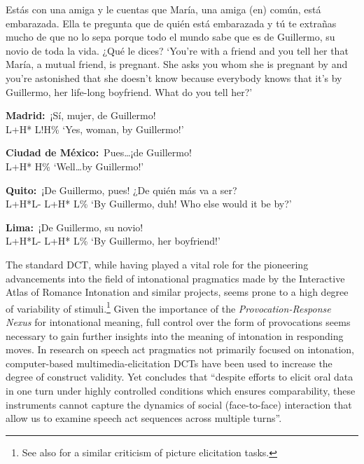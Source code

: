 \begin{exe}
	\ex \label{ex:obviedadQUESTIONNAIRE}
	Estás con una amiga y le cuentas que María, una amiga (en) común, está embarazada. Ella te pregunta que de quién está embarazada y tú te extrañas mucho de que no lo sepa porque todo el mundo sabe que es de Guillermo, su novio de toda la vida. ¿Qué le dices? 
	\glt `You're with a friend and you tell her that María, a mutual friend, is pregnant. She asks you whom she is pregnant by and you're astonished that she doesn't know because everybody knows that it's by Guillermo, her life-long boyfriend. What do you tell her?' 
	\begin{xlist}
		\ex \textbf{Madrid:}~¡Sí, mujer, de Guillermo! \\
		\hspace*{10em}L+H* L!H\% 
		\glt `Yes, woman, by Guillermo!' 
		
		\ex \textbf{Ciudad de México:}~Pues\ldots ¡de Guillermo! \\
		\hspace*{13em}L+H* H\% 
		\glt `Well\ldots by Guillermo!' 
		
		\ex \textbf{Quito:}~¡De Guillermo, pues! ¿De quién más va a ser? \\
		\hspace*{6em}L+H*L- \hspace*{10em} L+H* L\% 
		\glt `By Guillermo, duh! Who else would it be by?' 
		
		\ex \textbf{Lima:}~¡De Guillermo, su novio! \\
		\hspace*{6em}L+H*L- \hspace*{.5em} L+H* L\% 
		\glt `By Guillermo, her boyfriend!'
	\end{xlist}
\end{exe}

The standard \ac{DCT}, while having played a vital role for the pioneering advancements into the field of intonational pragmatics made by the Interactive Atlas of Romance Intonation and similar projects, seems prone to a high degree of variability of stimuli.\footnote{See also \citet[95]{Uth.2014} for a similar criticism of picture elicitation tasks.} Given the importance of the \textit{Provocation-Response Nexus} for intonational meaning, full control over the form of provocations seems necessary to gain further insights into the meaning of intonation in responding moves. In research on speech act pragmatics not primarily focused on intonation, computer-based multimedia-elicitation \acp{DCT} have been used to increase the degree of construct validity. Yet \citet[47]{FelixBrasdefer.2010} concludes that ``despite efforts to elicit oral data in one turn under highly controlled conditions which ensures comparability, these instruments
cannot capture the dynamics of social (face-to-face) interaction that allow us to examine speech act sequences across multiple turns''. 

